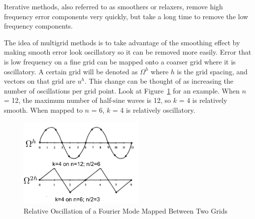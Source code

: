 \documentclass[12pt]{article}
\begin{document}
Iterative methods, also referred to as smoothers or relaxers, remove high frequency error components very quickly, but take a long time to remove the low frequency components. %
%
%

The idea of multigrid methods is to take advantage of the smoothing effect by making smooth error look oscillatory so it can be removed more easily. Error that is low frequency on a fine grid can be mapped onto a coarser grid where it is oscillatory. A certain grid will be denoted as $\Omega^{h}$ where $h$ is the grid spacing, and vectors on that grid are $u^{h}$. This change can be thought of as increasing the number of oscillations per grid point. Look at Figure~\ref{fig:FourierGridError} for an example. When $n$ = 12, the maximum number of half-sine waves is 12, so $k$ = 4 is relatively smooth. When mapped to $n$ = 6, $k$ = 4 is relatively oscillatory. 
%
\begin{figure}[!ht]
    \begin{center}
      \includegraphics [width=0.55\textwidth, height=0.33\textheight] {fig/FourierGridError}
   \end{center}
   \caption{Relative Oscillation of a Fourier Mode Mapped Between Two Grids}%
   \label{fig:FourierGridError}
\end{figure}
\end{document}
